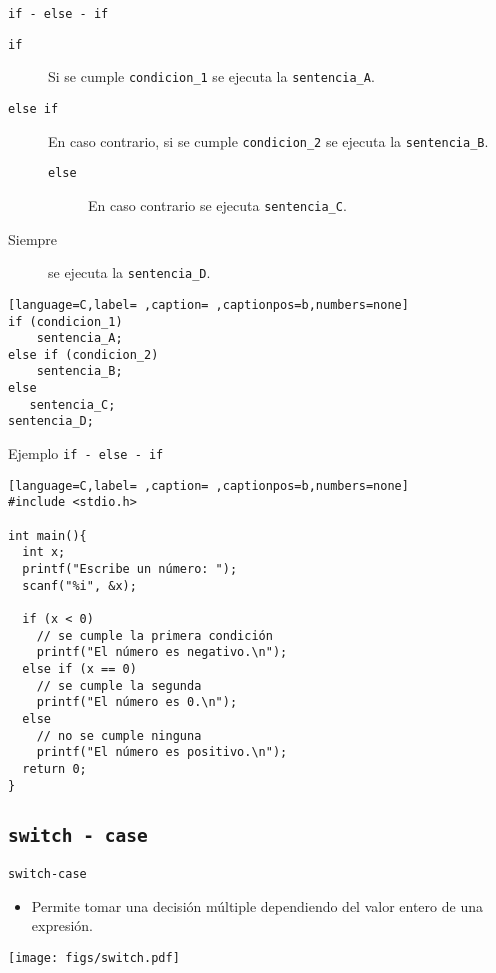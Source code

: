\documentclass[usenames,svgnames,dvipsnames, aspectratio=169]{beamer}
\begin{document}
\begin{frame}[label={sec:org963a706},fragile]{\texttt{if - else - if}}
 \begin{description}
\item[{\texttt{if}}] Si se cumple \texttt{condicion\_1} se ejecuta la \texttt{sentencia\_A}.
\item[{\texttt{else if}}] En caso contrario, si se cumple \texttt{condicion\_2} se ejecuta la \texttt{sentencia\_B}.
\begin{description}
\item[{\texttt{else}}] En caso contrario se ejecuta \texttt{sentencia\_C}.
\end{description}
\item[{Siempre}] se ejecuta la \texttt{sentencia\_D}.
\end{description}
\begin{lstlisting}[language=C,label= ,caption= ,captionpos=b,numbers=none]
if (condicion_1)
    sentencia_A;
else if (condicion_2)
    sentencia_B;
else
   sentencia_C;
sentencia_D;
\end{lstlisting}
\end{frame}

\begin{frame}[label={sec:org4a88002},fragile,plain]{Ejemplo \texttt{if - else - if}}
 \begin{lstlisting}[language=C,label= ,caption= ,captionpos=b,numbers=none]
#include <stdio.h>

int main(){
  int x;
  printf("Escribe un número: ");
  scanf("%i", &x);

  if (x < 0) 
    // se cumple la primera condición
    printf("El número es negativo.\n");
  else if (x == 0)
    // se cumple la segunda
    printf("El número es 0.\n");
  else
    // no se cumple ninguna
    printf("El número es positivo.\n");
  return 0;
}
\end{lstlisting}
\end{frame}

\subsection{\texttt{switch - case}}
\label{sec:org22e1169}

\begin{frame}[label={sec:org34e3c5b},fragile]{\texttt{switch-case}}
 \begin{itemize}
\item Permite tomar una decisión múltiple dependiendo del valor \alert{entero} de una expresión.
\end{itemize}

\begin{center}
\texttt{[image: figs/switch.pdf]}
\end{center}
\end{frame}
\end{document}

